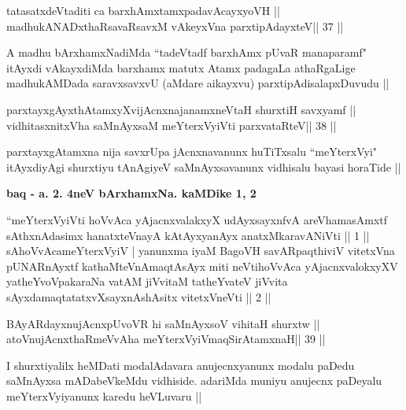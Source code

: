 \begin{shl}
tatasatxdeVtaditi ca barxhAmxtamxpadavAcayxyoVH ||
madhukANADxthaRsavaRsavxM vAkeyxVna parxtipAdayxteV\hfill || 37 ||
\end{shl}

\begin{artha}
A madhu bArxhamxNadiMda ``tadeVtadf barxhAmx pUvaR manaparamf" itAyxdi
vAkayxdiMda barxhamx matutx Atamx padagaLa athaRgaLige madhukAMDada
saravxsavxvU (aMdare aikayxvu) parxtipAdisalapxDuvudu ||
\end{artha}


\begin{shl}
parxtayxgAyxthAtamxyXvijAcnxnajanamxneV\s taH shurxtiH savxyamf ||
vidhitasxnitxVha saMnAyxsaM meYterxVyiVti parxvataRteV\hfill || 38 ||
\end{shl}

\begin{artha}
parxtayxgAtamxna nija savxrUpa jAcnxnavanunx huTiTxsalu ``meYterxVyi"
itAyxdiyAgi shurxtiyu tAnAgiyeV saMnAyxsavanunx vidhisalu bayasi
horaTide ||
\end{artha}

\begin{center}
\textbf{baq - a. 2. 4neV bArxhamxNa. kaMDike 1, 2}
\end{center}

\begin{shl}
``meYterxVyiVti hoVvAca yAjacnxvalakxyX udAyxsayxnfvA 
areV\s hamasAmxtf sAthxnAdasimx hanatxteV\s nayA
kAtAyxyanAyx anatxMkaravANiVti || 1 ||
sAhoVvAcameYterxVyiV | yanunxma iyaM BagoVH
savARpaqthiviV vitetxVna pUNARnAyxtf kathaMteVnA\s maqtAsAyx
miti neVtihoVvAca yAjacnxvalokxyXV yatheYvoVpakaraNa
vatAM jiVvitaM tatheYvateV jiVvita sAyxdamaqtatatxvXsayxnAshAsitx
vitetxVneVti || 2 ||
\end{shl}


\begin{shl}
BAyARdayxnujAcnxpUvoVR hi saMnAyxsoV vihitaH shurxtw ||
atoV\s nujAcnxthaRmeVvA\s\s ha meYterxVyiVmaqSirAtamxnaH\hfill || 39 ||
\end{shl}

\begin{artha}
I shurxtiyalilx heMDati modalAdavara anujecnxyanunx modalu paDedu
saMnAyxsa mADabeVkeMdu vidhiside. adariMda muniyu anujecnx paDeyalu
meYterxVyiyanunx karedu heVLuvaru ||
\end{artha}

